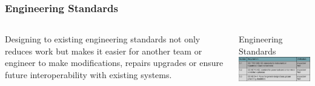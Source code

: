 \documentclass[aspectratio=169]{beamer}
\begin{document}
\begin{frame}
    \frametitle{Engineering Standards}

    \begin{columns}
        \begin{column}{0.48\textwidth}
            Designing to existing engineering standards not only reduces work but makes it easier
            for another team or engineer to make modifications, repairs upgrades or ensure future
            interoperability with existing systems.
        \end{column}

        \begin{column}{0.48\textwidth}
            \begin{block}{Engineering Standards}
                \includegraphics[width=7.3cm]{EngineeringStandards}
            \end{block}
        \end{column}
    \end{columns}
\end{frame}
\end{document}
